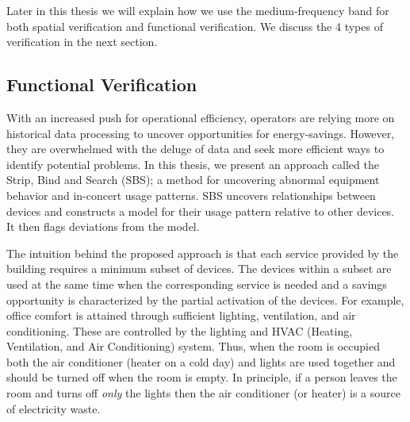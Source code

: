 Later in this thesis we will explain how we use the medium-frequency band for both spatial verification and functional verification.  We discuss
the 4 types of verification in the next section.







\subsection{Functional Verification}%
With an increased push for operational efficiency, operators are relying more on historical data processing to uncover opportunities for energy-savings.
However, they are overwhelmed with the deluge of data and seek more efficient ways to identify potential problems.
In this thesis, we present an approach called the Strip, Bind and Search (SBS); a method for uncovering abnormal 
equipment behavior and in-concert usage patterns.
SBS uncovers relationships between devices and constructs a model for their usage pattern relative to other devices.
It then flags deviations from the model. 


The intuition behind the proposed approach is that each service provided by the building requires a minimum subset of devices.
The devices within a subset are used at the same time when the corresponding service is needed and a savings opportunity is characterized by the partial activation of the devices.
For example, office comfort is attained through sufficient lighting, ventilation, and air conditioning.
These are controlled by the lighting and HVAC (Heating, Ventilation, and Air Conditioning) system.
Thus, when the room is occupied both the air conditioner (heater on a cold day) and lights are used together and should be turned off 
when the room is empty.
In principle, if a person leaves the room and turns off \emph{only} the lights then the air conditioner (or heater) is a source of electricity waste.

